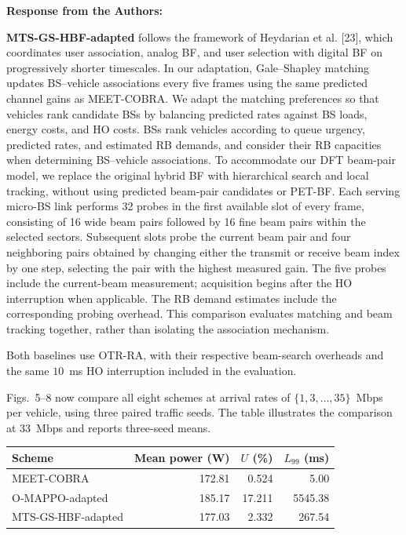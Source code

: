 \documentclass[11pt]{article}
\newenvironment{reviewedit}[1]
{\colorlet{responseblue}{#1}\colorlet{changeblue}{#1}\color{#1}}
{}
\newenvironment{authorresponse}
{\par\noindent\textcolor{responseblue}{\textbf{Response from the Authors:}}\par\color{responseblue}}
{\par}
\begin{document}
\begin{reviewedit}{red}
\begin{authorresponse}
\textbf{MTS-GS-HBF-adapted} follows the framework of Heydarian et al. [23],
which coordinates user association, analog BF, and user selection with
digital BF on progressively shorter timescales. In our adaptation,
Gale--Shapley matching updates BS--vehicle associations every five frames
using the same predicted channel gains as MEET-COBRA. We adapt the matching preferences
so that vehicles rank candidate BSs by balancing predicted rates against
BS loads, energy costs, and HO costs. BSs rank vehicles according to queue
urgency, predicted rates, and estimated RB demands, and consider their RB
capacities when determining BS--vehicle associations. To accommodate our DFT beam-pair model,
we replace the original hybrid BF with hierarchical search and local tracking,
without using predicted beam-pair candidates or PET-BF. Each serving micro-BS
link performs 32 probes in the first available slot of every frame, consisting
of 16 wide beam pairs followed by 16 fine beam pairs within the selected
sectors. Subsequent slots probe the current beam pair and four neighboring
pairs obtained by changing either the transmit or receive beam index by one
step, selecting the pair with the highest measured gain. The five probes
include the current-beam measurement; acquisition begins after the HO
interruption when applicable. The RB demand estimates include the corresponding
probing overhead. This comparison evaluates matching and beam tracking together,
rather than isolating the association mechanism.

Both baselines use OTR-RA, with their respective beam-search overheads and
the same $10$~ms HO interruption included in the evaluation.

Figs.~5--8 now compare all eight schemes at arrival rates of
$\{1,3,\ldots,35\}$~Mbps per vehicle, using three paired traffic seeds.
The table illustrates the comparison at $33$~Mbps and reports three-seed means.

\begin{center}
\small
\begin{tabular}{lrrr}
\hline
Scheme & Mean power (W) & $U$ (\%) & $L_{99}$ (ms) \\
\hline
MEET-COBRA & 172.81 & 0.524 & 5.00 \\
O-MAPPO-adapted & 185.17 & 17.211 & 5545.38 \\
MTS-GS-HBF-adapted & 177.03 & 2.332 & 267.54 \\
\hline
\end{tabular}
\end{center}


\end{authorresponse}
\end{reviewedit}
\end{document}
